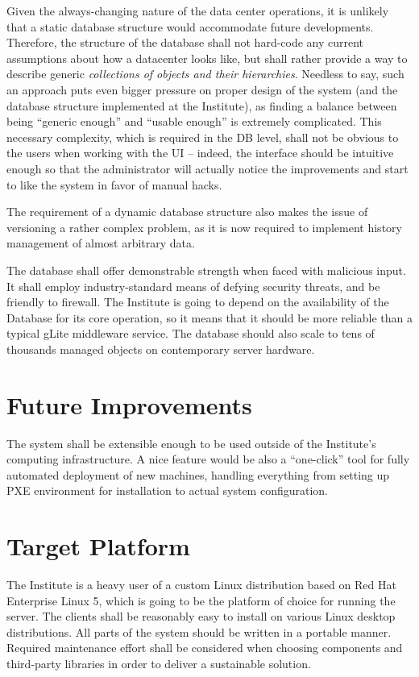 \documentclass{article}
\begin{document}
Given the always-changing nature of the data center operations, it is unlikely that a static database structure would accommodate
future developments.  Therefore, the structure of the database shall not hard-code any current assumptions about how a datacenter
looks like, but shall rather provide a way to describe generic {\em collections of objects and their hierarchies}.  Needless to
say, such an approach puts even bigger pressure on proper design of the system (and the database structure implemented at the
Institute), as finding a balance between being ``generic enough'' and ``usable enough'' is extremely complicated.  This necessary
complexity, which is required in the DB level, shall not be obvious to the users when working with the UI -- indeed, the interface
should be intuitive enough so that the administrator will actually notice the improvements and start to like the system in favor
of manual hacks.

The requirement of a dynamic database structure also makes the issue of versioning a rather complex problem, as it is now required
to implement history management of almost arbitrary data. 

The database shall offer demonstrable strength when faced with malicious input.  It shall employ industry-standard means of
defying security threats, and be friendly to firewall.  The Institute is going to depend on the availability of the Database for
its core operation, so it means that it should be more reliable than a typical gLite middleware service.  The database should also
scale to tens of thousands managed objects on contemporary server hardware.

\section{Future Improvements}

The system shall be extensible enough to be used outside of the Institute's computing infrastructure.  A nice feature would be
also a ``one-click'' tool for fully automated deployment of new machines, handling everything from setting up PXE environment for
installation to actual system configuration.

\section{Target Platform}

The Institute is a heavy user of a custom Linux distribution based on Red Hat Enterprise Linux 5, which is going to be the
platform of choice for running the server.  The clients shall be reasonably easy to install on various Linux desktop
distributions.  All parts of the system should be written in a portable manner.  Required maintenance effort shall be considered
when choosing components and third-party libraries in order to deliver a sustainable solution.
\end{document}

